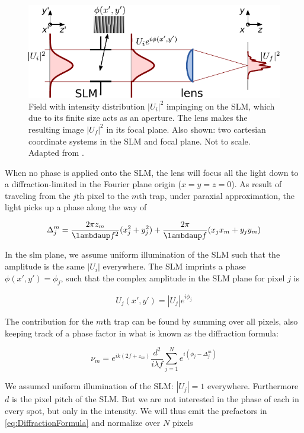 \begin{figure}
    \centering
    \includegraphics[width = 12cm]{figures/SLMfigure.pdf}
    \caption{Field with intensity distribution $|U_i|^2$ impinging on the SLM, which due to its finite size acts as an aperture. The lens makes the resulting image $|U_f|^2$ in its focal plane. Also shown: two cartesian coordinate systems in the SLM and focal plane. Not to scale. Adapted from \cite{Labuhn2016}.}
    \label{fig:SLMLens}
\end{figure}

When no phase is applied onto the SLM, the lens will focus all the light down to a diffraction-limited in the Fourier plane origin ($x=y=z=0$). As result of traveling from the $j$th pixel to the $m$th trap, under paraxial approximation, the light picks up a phase along the way of 

\begin{equation}
    \Delta_j^m = \frac{2\pi z_m}{\lambdaup f^2}(x_j^2+y_j^2)+\frac{2\pi}{\lambdaup f}(x_j x_m +y_j y_m)
\end{equation}

In the slm plane, we assume uniform illumination of the SLM such that the amplitude is the same $|U_i|$ everywhere. The SLM imprints a phase $\phi(x',y') = \phi_j$, such that the complex amplitude in the SLM plane for pixel $j$ is

\begin{equation}
    U_j(x',y') = |U_j| e^{i \phi_j}
\end{equation}

The contribution for the $m$th trap can be found by summing over all pixels, also keeping track of a phase factor in what is known as the diffraction formula:

\begin{equation}\label{eq:DiffractionFormula}
    \nu_m = e^{i k \left(2 f + z_m\right)}
    \frac{d^2}{i \lambda f} \sum_{j=1}^N e^{i(\phi_j - \Delta_j^m)}
\end{equation}

We assumed uniform illumination of the \ac{SLM}: $|U_j| =1$ everywhere. Furthermore $d$ is the pixel pitch of the SLM. But we are not interested in the phase of each in every spot, but only in the intensity. We will thus emit the prefactors in \cref{eq:DiffractionFormula} and normalize over $N$ pixels

